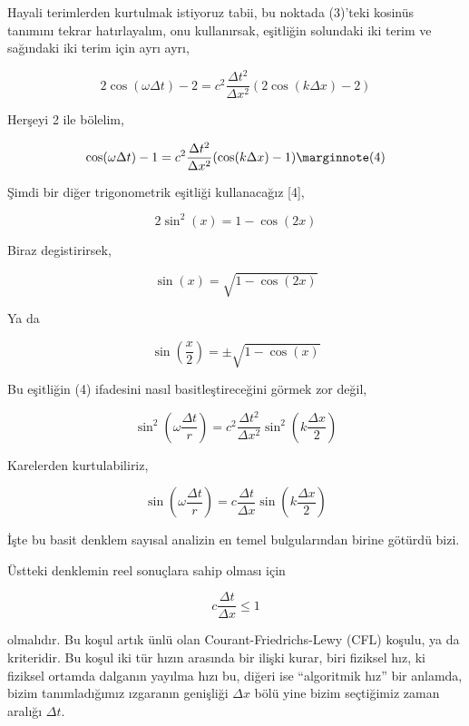 \documentclass[12pt,fleqn]{article}\usepackage{../../common}
\begin{document}
Hayali terimlerden kurtulmak istiyoruz tabii, bu noktada (3)'teki kosinüs
tanımını tekrar hatırlayalım, onu kullanırsak, eşitliğin solundaki iki terim ve
sağındaki iki terim için ayrı ayrı,

$$
2 \cos(\omega \Delta t) - 2 = c^2 \frac{\Delta t^2}{\Delta x^2}
(2 \cos(k\Delta x) - 2)
$$

Herşeyi 2 ile bölelim,

$$
\cos(\omega \Delta t) - 1 = c^2 \frac{\Delta t^2}{\Delta x^2}
(\cos(k\Delta x) - 1)
\mlabel{4}
$$

Şimdi bir diğer trigonometrik eşitliği kullanacağız [4],

$$
2\sin^2(x) = 1 - \cos (2x)
$$

Biraz degistirirsek,

$$
\sin (x) = \sqrt{1 - \cos (2x)}
$$

Ya da

$$
\sin (\frac{x}{2}) = \pm \sqrt{1 - \cos (x)}
$$

Bu eşitliğin (4) ifadesini nasıl basitleştireceğini görmek zor değil,

$$
\sin^2(\omega \frac{\Delta t}{r}) =
c^2 \frac{\Delta t^2}{\Delta x^2} \sin^2 (k \frac{\Delta x}{2} )
$$

Karelerden kurtulabiliriz,

$$
\sin(\omega \frac{\Delta t}{r}) =
c \frac{\Delta t}{\Delta x} \sin (k \frac{\Delta x}{2} )
$$

İşte bu basit denklem sayısal analizin en temel bulgularından birine götürdü
bizi.

Üstteki denklemin reel sonuçlara sahip olması için

$$
c \frac{\Delta t}{\Delta x} \le 1
$$

olmalıdır. Bu koşul artık ünlü olan Courant-Friedrichs-Lewy (CFL) koşulu, ya da
kriteridir. Bu koşul iki tür hızın arasında bir ilişki kurar, biri fiziksel hız,
ki fiziksel ortamda dalganın yayılma hızı bu, diğeri ise ``algoritmik hız'' bir
anlamda, bizim tanımladığımız ızgaranın genişliği $\Delta x$ bölü yine bizim
seçtiğimiz zaman aralığı $\Delta t$.
\end{document}
